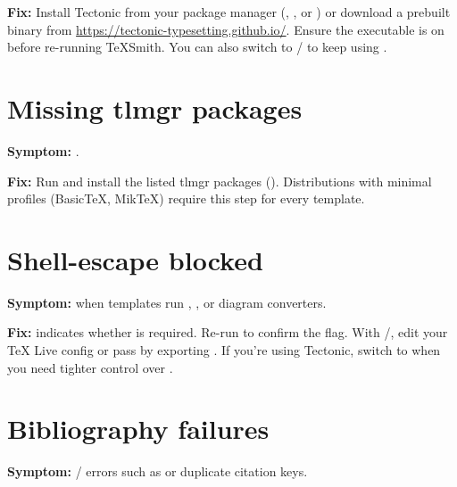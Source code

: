 \documentclass[a4paper,twoside]{article}
\begin{document}
\textbf{Fix:} Install Tectonic from your package manager (, , or ) or download a prebuilt binary from \url{https://tectonic-typesetting.github.io/}. Ensure the  executable is on  before re-running TeXSmith. You can also switch to / to keep using .
\section{Missing tlmgr packages}
\textbf{Symptom:} .

\textbf{Fix:} Run  and install the listed tlmgr packages (). Distributions with minimal profiles (BasicTeX, MikTeX) require this step for every template.
\section{Shell-escape blocked}
\textbf{Symptom:}  when templates run , , or diagram converters.

\textbf{Fix:}  indicates whether  is required. Re-run  to confirm the flag. With /, edit your \TeX{} Live config or pass  by exporting . If you're using Tectonic, switch to  when you need tighter control over .
\section{Bibliography failures}
\textbf{Symptom:} / errors such as  or duplicate citation keys.
\end{document}
